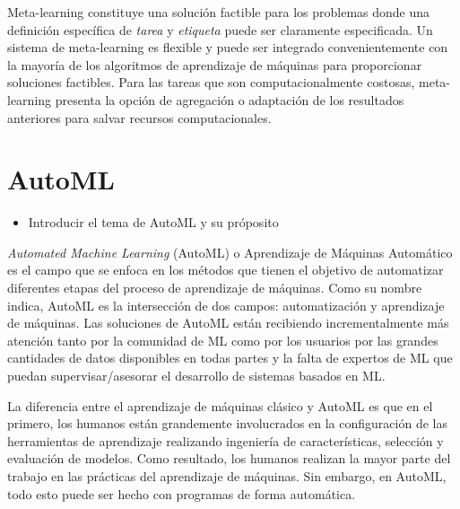 Meta-learning constituye una solución factible para los problemas donde una definición específica de \textit{tarea} y \textit{etiqueta} puede ser claramente especificada. Un sistema de meta-learning es flexible y puede ser integrado convenientemente con la mayoría de los algoritmos de aprendizaje de máquinas para proporcionar soluciones factibles. Para las tareas que son computacionalmente costosas, meta-learning presenta la opción de agregación o adaptación de los resultados anteriores para salvar recursos computacionales.
 
\section{AutoML}\label{sec:automl}

\begin{itemize}
	\item Introducir el tema de AutoML y su próposito
\end{itemize}



\textit{Automated Machine Learning} (AutoML) o Aprendizaje de Máquinas Automático es el campo que se enfoca en los métodos que tienen el objetivo de automatizar diferentes etapas del proceso de aprendizaje de máquinas. Como su nombre indica, AutoML es la intersección de dos campos: automatización y aprendizaje de máquinas. Las soluciones de AutoML están recibiendo incrementalmente más atención tanto por la comunidad de ML como por los usuarios por las grandes cantidades de datos disponibles en todas partes y la falta de expertos de ML que puedan supervisar/asesorar el desarrollo de sistemas basados en ML.

La diferencia entre el aprendizaje de máquinas clásico y AutoML es que en el primero, los humanos están grandemente involucrados en la configuración de las herramientas de aprendizaje realizando ingeniería de características, selección y evaluación de modelos. Como resultado, los humanos realizan la mayor parte del trabajo en las prácticas del aprendizaje de máquinas. Sin embargo, en AutoML, todo esto puede ser hecho con programas de forma automática.


